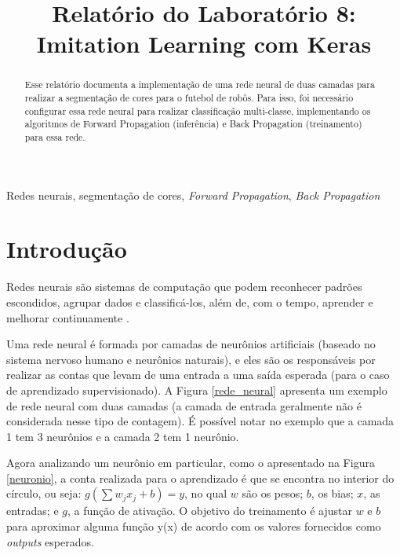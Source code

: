 \documentclass[conference]{IEEEtran}
\begin{document}
\title{Relatório do Laboratório 8: \\ Imitation Learning com Keras\\
}

\author{
}

\maketitle

\begin{abstract}
Esse relatório documenta a implementação de uma rede neural de duas camadas para realizar a segmentação de cores para o futebol de robôs. Para isso, foi necessário configurar essa rede neural para realizar classificação multi-classe, implementando os algoritmos de Forward Propagation (inferência) e Back Propagation (treinamento) para essa rede.
\end{abstract}

\begin{IEEEkeywords}
Redes neurais, segmentação de cores, \textit{Forward Propagation}, \textit{Back Propagation}
\end{IEEEkeywords}

\section{Introdução}
Redes neurais são sistemas de computação que podem reconhecer padrões escondidos, agrupar dados e classificá-los, além de, com o tempo, aprender e melhorar continuamente \cite{sas}.

Uma rede neural é formada por camadas de neurônios artificiais (baseado no sistema nervoso humano e neurônios naturais), e eles são os responsáveis por realizar as contas que levam de uma entrada a uma saída esperada (para o caso de aprendizado supervisionado). A Figura \ref{rede_neural} apresenta um exemplo de rede neural com duas camadas (a camada de entrada geralmente não é considerada nesse tipo de contagem). É possível notar no exemplo que a camada 1 tem 3 neurônios e a camada 2 tem 1 neurônio. 

Agora analizando um neurônio em particular, como o apresentado na Figura \ref{neuronio}, a conta realizada para o aprendizado é que se encontra no interior do círculo, ou seja: $g\left ( \sum w_j x_j + b \right ) = y$, no qual $w$ são os pesos; $b$, os bias; $x$, as entradas; e $g$, a função de ativação. O objetivo do treinamento é ajustar $w$ e $b$ para aproximar alguma função y(x) de acordo com os valores fornecidos como \textit{outputs} esperados.
\end{document}
